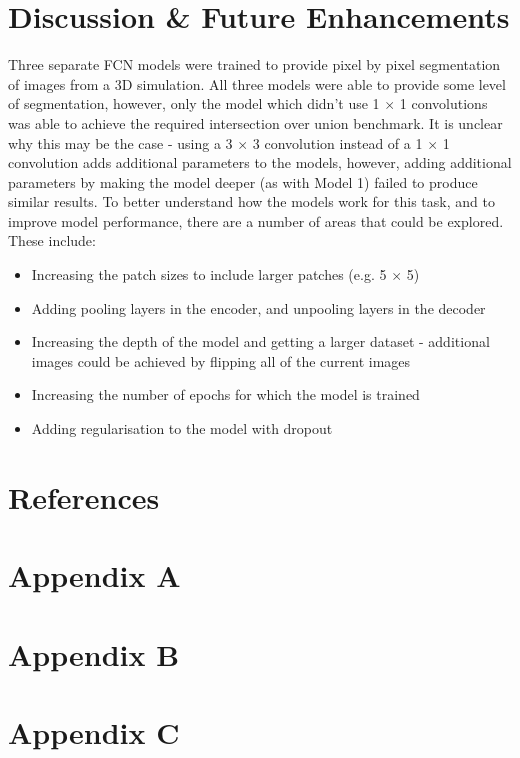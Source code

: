 \documentclass[a4paper]{article}
\begin{document}
\newpage

\section{Discussion \& Future Enhancements}
Three separate FCN models were trained to provide pixel by pixel segmentation of images from a 3D simulation. All three models were able to provide some level of segmentation, however, only the model which didn't use 1 $\times$ 1 convolutions was able to achieve the required intersection over union benchmark. It is unclear why this may be the case - using a 3 $\times$ 3 convolution instead of a 1 $\times$ 1 convolution adds additional parameters to the models, however, adding additional parameters by making the model deeper (as with Model 1) failed to produce similar results. To better understand how the models work for this task, and to improve model performance, there are a number of areas that could be explored. These include:
\begin{itemize}
\item Increasing the patch sizes to include larger patches (e.g. 5 $\times$ 5)
\item Adding pooling layers in the encoder, and unpooling layers in the decoder
\item Increasing the depth of the model and getting a larger dataset - additional images could be achieved by flipping all of the current images
\item Increasing the number of epochs for which the model is trained
\item Adding regularisation to the model with dropout
\end{itemize}

\section{References}

\section{Appendix A}

\section{Appendix B}

\section{Appendix C}
\end{document}
